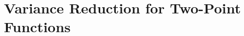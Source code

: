 \documentclass[%
    twoside, openright, titlepage, numbers=noenddot,%
    cleardoublepage=empty,%
    abstract=false,
    BCOR=5.5mm, paper=a5, fontsize=10pt,%
]{scrreprt}
\begin{document}
\cleardoublepage%
\def\dir{chapters/part-1/02-openqxd}


\cleardoublepage%
\def\dir{chapters/part-1/03-quda}


\cleardoublepage%
\def\dir{chapters/part-1/04-interface}


\cleardoublepage%
\def\dir{chapters/part-1/05-developing}


%

%

\cleardoublepage%
\def\dir{chapters/part-1/08-performance}


\cleardoublepage%
\def\dir{chapters/part-1/09-cicd}


\cleardoublepage%
\def\dir{chapters/part-1/10-memory-manager}


\cleardoublepage%
\def\dir{chapters/part-1/11-conclusions}


\part{Variance Reduction for Two-Point Functions}
\label{part:variance}

\cleardoublepage%
\def\dir{chapters/part-2/01-introduction}


\cleardoublepage%
\def\dir{chapters/part-2/02-two-pt-corr}


\cleardoublepage%
\def\dir{chapters/part-2/03-subspace-deflation}


\cleardoublepage%
\def\dir{chapters/part-2/04-local-coherence}

\end{document}
